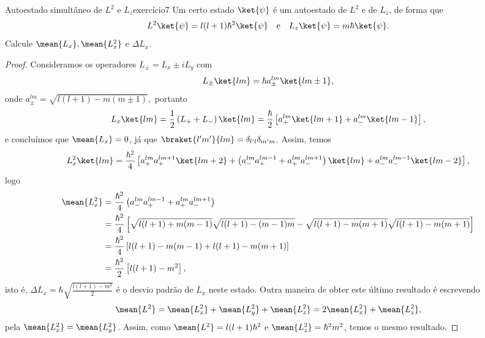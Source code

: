 \begin{exercício}{Autoestado simultâneo de \(L^2\) e \(L_z\)}{exercício7}
    Um certo estado \(\ket{\psi}\) é um autoestado de \(L^2\) e de \(L_z\), de forma que
    \begin{equation*}
        L^2\ket{\psi} = l(l+1)\hbar^2 \ket{\psi}\quad\text{e}\quad L_z\ket{\psi} = m\hbar \ket{\psi}.
    \end{equation*}
    Calcule \(\mean{L_x}, \mean{L_x^2}\) e \(\Delta L_x\).
\end{exercício}
\begin{proof}
    Consideramos os operadores \(L_\pm = L_x \pm i L_y\) com
    \begin{equation*}
        L_\pm \ket{lm} = \hbar a_\pm^{lm}\ket{l m\pm1},
    \end{equation*}
    onde \(a_\pm^{lm} = \sqrt{l(l+1) - m(m\pm1)},\)
    portanto
    \begin{equation*}
        L_x\ket{lm} = \frac12 \left(L_+ + L_-\right)\ket{lm} = \frac{\hbar}{2}\left[a_+^{lm}\ket{lm + 1} + a_-^{lm}\ket{lm -1}\right],
    \end{equation*}
    e concluímos que \(\mean{L_x} = 0\), já que \(\braket{l'm'}{lm} = \delta_{l'l}\delta_{m'm}\). Assim, temos
    \begin{equation*}
        L_x^2 \ket{lm} = \frac{\hbar^2}{4}\left[a_+^{lm}a_+^{lm+1}\ket{l m+2} + \left(a_-^{lm}a_+^{lm-1}+a_+^{lm}a_-^{lm+1}\right)\ket{lm} + a_-^{lm}a_-^{lm-1}\ket{lm-2}\right],
    \end{equation*}
    logo
    \begin{align*}
        \mean{L_x^2} &= \frac{\hbar^2}{4}\left(a_-^{lm}a_+^{lm-1}+a_+^{lm}a_-^{lm+1}\right)\\
                     &= \frac{\hbar^2}{4}\left[\sqrt{l(l+1) + m(m-1)}\sqrt{l(l+1) - (m-1)m} - \sqrt{l(l+1) - m(m+1)}\sqrt{l(l+1) - m(m+1)}\right]\\
                     &= \frac{\hbar^2}{4}\left[l(l+1) - m(m-1) + l(l+1) - m(m+1)\right]\\
                     &= \frac{\hbar^2}{2}\left[l(l+1) - m^2\right],
    \end{align*}
    isto é, \(\Delta L_x = \hbar \sqrt{\frac{l(l+1) - m^2}{2}}\) é o desvio padrão de \(L_x\) neste estado. Outra maneira de obter este último resultado é escrevendo
    \begin{equation*}
        \mean{L^2} = \mean{L_x^2} + \mean{L_y^2} + \mean{L_z^2} = 2\mean{L_x^2} + \mean{L_z^2},
    \end{equation*}
    pela \todo[simetria] \(\mean{L_x^2} = \mean{L_y^2}\). Assim, como \(\mean{L^2} = l(l + 1)\hbar^2\) e \(\mean{L_z^2} = \hbar^2 m^2\), temos o mesmo resultado.
\end{proof}
